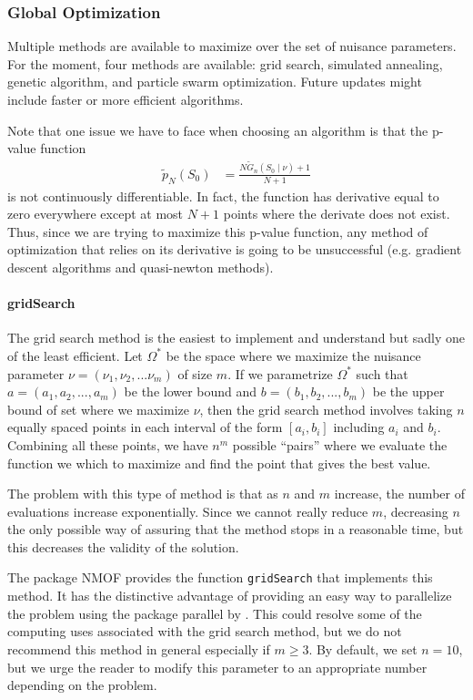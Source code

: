 \documentclass[]{article}\usepackage[]{graphicx}\usepackage[]{color}
\newcommand{\pkg}[1]{{\normalfont\fontseries{b}\selectfont #1}}
\let\code=\texttt
\begin{document}
\subsubsection{Global Optimization}

Multiple methods are available to maximize over the set of nuisance parameters. For the moment, four methods are available: grid search, simulated annealing, genetic algorithm, and particle swarm optimization. Future updates might include faster or more efficient algorithms.

Note that one issue we have to face when choosing an algorithm is that the p-value function
	\begin{align}
		\tilde{p}_{N}(S_{0}) & =\frac{N\tilde{G}_{n}(S_{0} \mid \nu)+1}{N+1}
	\end{align}
	is not continuously differentiable. In fact, the function has derivative equal to zero everywhere except at most $N+1$ points where the derivate does not exist. Thus, since we are trying to maximize this p-value function, any method of optimization that relies on its derivative is going to be unsuccessful (e.g. gradient descent algorithms and quasi-newton methods).

	\paragraph{gridSearch}

	The grid search method is the easiest to implement and understand but sadly one of the least efficient. Let $\Omega^*$ be the space where we maximize the nuisance parameter $\nu=(\nu_1,\nu_2,...\nu_m)$ of size $m$. If we parametrize $\Omega^*$ such that $a=(a_1,a_2,...,a_m)$ be the lower bound and $b=(b_1,b_2,...,b_m)$ be the upper bound of set where we maximize $\nu$, then the grid search method involves taking $n$ equally spaced points in each interval of the form $[a_i,b_i]$ including $a_i$ and $b_i$. Combining all these points, we have $n^m$ possible ``pairs'' where we evaluate the function we which to maximize and find the point that gives the best value.

	The problem with this type of method is that as $n$ and $m$ increase, the number of evaluations increase exponentially. Since we cannot really reduce $m$, decreasing $n$ the only possible way of assuring that the method stops in a reasonable time, but this decreases the validity of the solution.

	The package \pkg{NMOF} \citep{gilli_numerical_2011} provides the function \code{gridSearch} that implements this method. It has the distinctive advantage of providing an easy way to parallelize the problem using the package \pkg{parallel} by \cite{r_core_team_r:_2016}. This could resolve some of the computing uses associated with the grid search method, but we do not recommend this method in general especially if $m\geq3$. By default, we set $n=10$, but we urge the reader to modify this parameter to an appropriate number depending on the problem.
\end{document}
